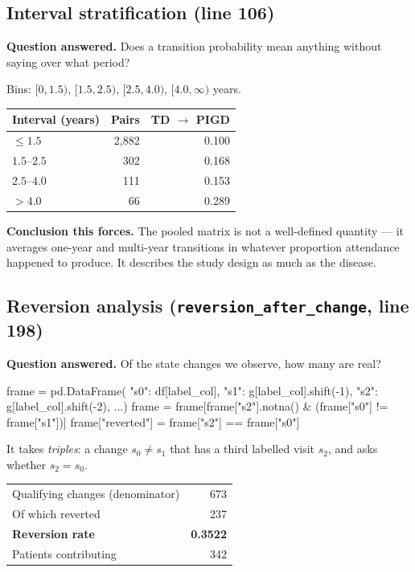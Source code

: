 \documentclass[11pt,a4paper]{article}
\newcommand{\code}[1]{\texttt{\small #1}}
\begin{document}
\subsection{Interval stratification \quad (line 106)}

\textbf{Question answered.} Does a transition probability mean anything without
saying over what period?

Bins: $[0, 1.5)$, $[1.5, 2.5)$, $[2.5, 4.0)$, $[4.0, \infty)$ years.

\begin{table}[h]
\centering
\begin{tabular}{@{}lrr@{}}
\toprule
\textbf{Interval (years)} & \textbf{Pairs} & \textbf{TD $\rightarrow$ PIGD} \\
\midrule
$\leq 1.5$    & 2{,}882 & 0.100 \\
$1.5$--$2.5$  &    302 & 0.168 \\
$2.5$--$4.0$  &    111 & 0.153 \\
$> 4.0$       &     66 & 0.289 \\
\bottomrule
\end{tabular}
\end{table}

\noindent
\textbf{Conclusion this forces.} The pooled matrix is not a well-defined
quantity --- it averages one-year and multi-year transitions in whatever
proportion attendance happened to produce. It describes the study design as
much as the disease.

\subsection{Reversion analysis \quad (\code{reversion\_after\_change}, line 198)}

\textbf{Question answered.} Of the state changes we observe, how many are real?

\begin{codeblock}
frame = pd.DataFrame({
    "s0": df[label_col],
    "s1": g[label_col].shift(-1),
    "s2": g[label_col].shift(-2),
    ...})
frame = frame[frame["s2"].notna() & (frame["s0"] != frame["s1"])]
frame["reverted"] = frame["s2"] == frame["s0"]
\end{codeblock}

\noindent
It takes \emph{triples}: a change $s_0 \neq s_1$ that has a third labelled
visit $s_2$, and asks whether $s_2 = s_0$.

\begin{table}[h]
\centering
\begin{tabular}{@{}lr@{}}
\toprule
Qualifying changes (denominator) & 673 \\
Of which reverted                & 237 \\
\textbf{Reversion rate}          & \textbf{0.3522} \\
Patients contributing            & 342 \\
\bottomrule
\end{tabular}
\end{table}
\end{document}
